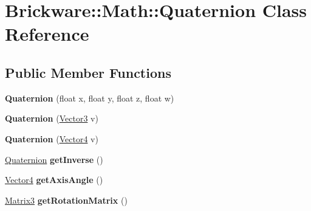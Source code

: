 \hypertarget{classBrickware_1_1Math_1_1Quaternion}{}\section{Brickware\+:\+:Math\+:\+:Quaternion Class Reference}
\label{classBrickware_1_1Math_1_1Quaternion}
\subsection*{Public Member Functions}
\begin{DoxyCompactItemize}
\item 
\hypertarget{classBrickware_1_1Math_1_1Quaternion_af1293ea7f1913326a47270aa3a2092fe}{}{\bfseries Quaternion} (float x, float y, float z, float w)\label{classBrickware_1_1Math_1_1Quaternion_af1293ea7f1913326a47270aa3a2092fe}

\item 
\hypertarget{classBrickware_1_1Math_1_1Quaternion_a45e9a13092526cd0553c891e413f78e8}{}{\bfseries Quaternion} (\hyperlink{classBrickware_1_1Math_1_1Vector3}{Vector3} v)\label{classBrickware_1_1Math_1_1Quaternion_a45e9a13092526cd0553c891e413f78e8}

\item 
\hypertarget{classBrickware_1_1Math_1_1Quaternion_a28aad8f91c62c0ac6f7f365abb71317e}{}{\bfseries Quaternion} (\hyperlink{classBrickware_1_1Math_1_1Vector4}{Vector4} v)\label{classBrickware_1_1Math_1_1Quaternion_a28aad8f91c62c0ac6f7f365abb71317e}

\item 
\hypertarget{classBrickware_1_1Math_1_1Quaternion_a8e7210091a5e3283670af44b09e3cf09}{}\hyperlink{classBrickware_1_1Math_1_1Quaternion}{Quaternion} {\bfseries get\+Inverse} ()\label{classBrickware_1_1Math_1_1Quaternion_a8e7210091a5e3283670af44b09e3cf09}

\item 
\hypertarget{classBrickware_1_1Math_1_1Quaternion_a08170925dfaa3bb01d847e6fcbc5a99b}{}\hyperlink{classBrickware_1_1Math_1_1Vector4}{Vector4} {\bfseries get\+Axis\+Angle} ()\label{classBrickware_1_1Math_1_1Quaternion_a08170925dfaa3bb01d847e6fcbc5a99b}

\item 
\hypertarget{classBrickware_1_1Math_1_1Quaternion_a02665e33783b15205d436e0bebb872c4}{}\hyperlink{classBrickware_1_1Math_1_1Matrix3}{Matrix3} {\bfseries get\+Rotation\+Matrix} ()\label{classBrickware_1_1Math_1_1Quaternion_a02665e33783b15205d436e0bebb872c4}


\end{DoxyCompactItemize}
